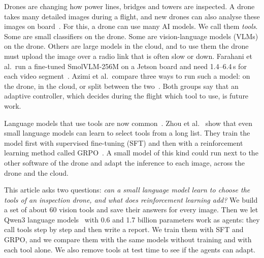 \documentclass[final,5p,times,twocolumn]{elsarticle}
\makeatletter
\renewcommand\section{\@startsection{section}{1}{\z@}{-16pt plus -3pt minus -2pt}{8pt}{\normalfont\normalsize\bfseries}}
\makeatother
\begin{document}
\section{Introduction}

Drones are changing how power lines, bridges and towers are inspected. A drone takes many detailed images during a flight, and new drones can also analyse these images on board~\cite{p2s}. For this, a drone can use many AI models. We call them \emph{tools}. Some are small classifiers on the drone. Some are vision-language models (VLMs) on the drone. Others are large models in the cloud, and to use them the drone must upload the image over a radio link that is often slow or down. Farahani et al.\ run a fine-tuned SmolVLM-256M on a Jetson board and need 1.4--6.4\,s for each video segment~\cite{evlm}. Azimi et al.\ compare three ways to run such a model: on the drone, in the cloud, or split between the two~\cite{splitvlm}. Both groups say that an adaptive controller, which decides during the flight which tool to use, is future work.

Language models that use tools are now common~\cite{toolformer,react,toolllm}. Zhou et al.~\cite{zhou2026} show that even small language models can learn to select tools from a long list. They train the model first with supervised fine-tuning (SFT) and then with a reinforcement learning method called GRPO~\cite{grpo}. A small model of this kind could run next to the other software of the drone and adapt the inference to each image, across the drone and the cloud.

This article asks two questions: \emph{can a small language model learn to choose the tools of an inspection drone, and what does reinforcement learning add?} We build a set of about 60 vision tools and save their answers for every image. Then we let Qwen3 language models~\cite{qwen3} with 0.6 and 1.7 billion parameters work as agents: they call tools step by step and then write a report. We train them with SFT and GRPO, and we compare them with the same models without training and with each tool alone. We also remove tools at test time to see if the agents can adapt.
\end{document}
